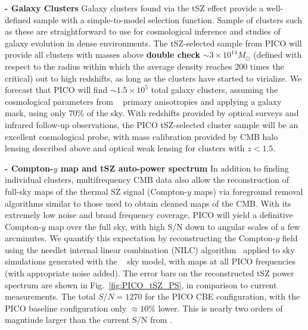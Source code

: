 \documentclass[PICOReport.tex]{subfiles}
\begin{document}
%
{\bf - Galaxy Clusters} \hspace{0.1in} \label{clusters}  Galaxy clusters found via the tSZ  effect provide a well-defined sample with a simple-to-model selection function. Sample of clusters such as these are straightforward to use for cosmological inference and studies of galaxy evolution in dense environments. The tSZ-selected sample from PICO will provide all clusters with masses above {\bf double check} $\sim3\times10^{14} M_\odot$ (defined with respect to the radius within which the average density reaches 200 times the critical) out to high redshifts, as long as the clusters have started to virialize. We forecast that PICO will find $\sim 1.5\times 10^5$ total galaxy clusters, assuming the cosmological parameters from \planck~ primary anisotropies and applying a galaxy mask, using only 70\% of the sky. With redshifts provided by optical surveys and infrared follow-up observations, the PICO tSZ-selected cluster sample will be an excellent cosmological probe, with mass calibration provided by CMB halo lensing described above and optical weak lensing for clusters with $z < 1.5$. 

%
{\bf - Compton-$y$ map and tSZ auto-power spectrum} \hspace{0.1in} \label{ymap}  In addition to finding individual clusters, multifrequency CMB data also allow the reconstruction of full-sky maps of the thermal SZ signal (Compton-$y$ maps) via foreground removal algorithms similar to those used to obtain cleaned maps of the CMB.  With its extremely low noise and broad frequency coverage, PICO will yield a definitive Compton-$y$ map over the full sky, with high S/N down to angular scales of a few arcminutes.  We quantify this expectation by reconstructing the Compton-$y$ field using the needlet internal linear combination (NILC) algorithm~\citep{Delabrouille2009} applied to sky simulations generated with the \planck~ sky model, with maps at all PICO frequencies (with appropriate noise added).  The error bars on the reconstructed tSZ power spectrum are shown in Fig.~\ref{fig:PICO_tSZ_PS}, in comparison to current measurements.  The total $S/N = 1270$ for the PICO CBE configuration, with the PICO baseline configuration only $\approx 10$\% lower.  This is nearly two orders of magntiude larger than the current S/N from \planck.
\end{document}
